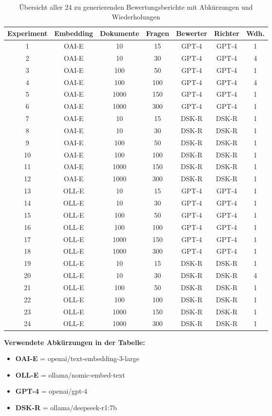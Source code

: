 \begin{table}[htbp]
    \centering
    \begin{tabular}{|c|c|c|c|c|c|c|}
        \hline
        \textbf{Experiment} & \textbf{Embedding} & \textbf{Dokumente} & \textbf{Fragen} & \textbf{Bewerter} & \textbf{Richter} & \textbf{Wdh.} \\
        \hline
        1  & OAI-E & 10   & 15  & GPT-4 & GPT-4 & 1 \\
        2  & OAI-E & 10   & 30  & GPT-4 & GPT-4 & 4 \\
        3  & OAI-E & 100  & 50  & GPT-4 & GPT-4 & 1 \\
        4  & OAI-E & 100  & 100 & GPT-4 & GPT-4 & 4 \\
        5  & OAI-E & 1000 & 150 & GPT-4 & GPT-4 & 1 \\
        6  & OAI-E & 1000 & 300 & GPT-4 & GPT-4 & 1 \\
        \hline
        7  & OAI-E & 10   & 15  & DSK-R & DSK-R & 1 \\
        8  & OAI-E & 10   & 30  & DSK-R & DSK-R & 1 \\
        9  & OAI-E & 100  & 50  & DSK-R & DSK-R & 1 \\
        10 & OAI-E & 100  & 100 & DSK-R & DSK-R & 1 \\
        11 & OAI-E & 1000 & 150 & DSK-R & DSK-R & 1 \\
        12 & OAI-E & 1000 & 300 & DSK-R & DSK-R & 1 \\
        \hline
        13 & OLL-E & 10   & 15  & GPT-4 & GPT-4 & 1 \\
        14 & OLL-E & 10   & 30  & GPT-4 & GPT-4 & 1 \\
        15 & OLL-E & 100  & 50  & GPT-4 & GPT-4 & 1 \\
        16 & OLL-E & 100  & 100 & GPT-4 & GPT-4 & 1 \\
        17 & OLL-E & 1000 & 150 & GPT-4 & GPT-4 & 1 \\
        18 & OLL-E & 1000 & 300 & GPT-4 & GPT-4 & 1 \\
        \hline
        19 & OLL-E & 10   & 15  & DSK-R & DSK-R & 1 \\
        20 & OLL-E & 10   & 30  & DSK-R & DSK-R & 4 \\
        21 & OLL-E & 100  & 50  & DSK-R & DSK-R & 1 \\
        22 & OLL-E & 100  & 100 & DSK-R & DSK-R & 1 \\
        23 & OLL-E & 1000 & 150 & DSK-R & DSK-R & 1 \\
        24 & OLL-E & 1000 & 300 & DSK-R & DSK-R & 1 \\
        \hline
    \end{tabular}
    \caption{Übersicht aller 24 zu generierenden Bewertungsberichte mit Abkürzungen und Wiederholungen}
    \label{tab:bewertungsberichte}
\end{table}

\noindent
\textbf{Verwendete Abkürzungen in der Tabelle:}
\begin{itemize}
    \item \textbf{OAI-E} = openai/text-embedding-3-large
    \item \textbf{OLL-E} = ollama/nomic-embed-text
    \item \textbf{GPT-4} = openai/gpt-4
    \item \textbf{DSK-R} = ollama/deepseek-r1:7b
\end{itemize} 